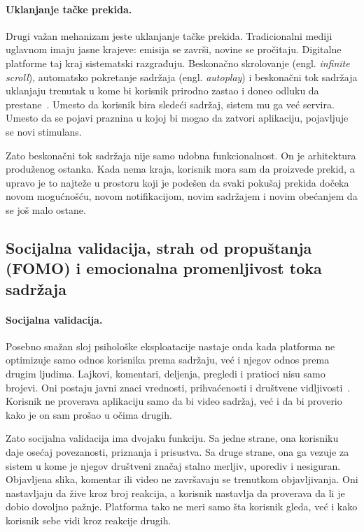 \paragraph{Uklanjanje tačke prekida.}
Drugi važan mehanizam jeste uklanjanje tačke prekida. Tradicionalni mediji uglavnom imaju jasne krajeve: emisija se završi, novine se pročitaju. Digitalne platforme taj kraj sistematski razgrađuju. Beskonačno skrolovanje (engl. \textit{infinite scroll}), automatsko pokretanje sadržaja (engl. \textit{autoplay}) i beskonačni tok sadržaja uklanjaju trenutak u kome bi korisnik prirodno zastao i doneo odluku da prestane~\cite{montag2019addictive}. Umesto da korisnik bira sledeći sadržaj, sistem mu ga već servira. Umesto da se pojavi praznina u kojoj bi mogao da zatvori aplikaciju, pojavljuje se novi stimulans.

Zato beskonačni tok sadržaja nije samo udobna funkcionalnost. On je arhitektura produženog ostanka. Kada nema kraja, korisnik mora sam da proizvede prekid, a upravo je to najteže u prostoru koji je podešen da svaki pokušaj prekida dočeka novom mogućnošću, novom notifikacijom, novim sadržajem i novim obećanjem da se još malo ostane.

\subsection{Socijalna validacija, strah od propuštanja (FOMO) i emocionalna promenljivost toka sadržaja}

\paragraph{Socijalna validacija.}
Posebno snažan sloj psihološke eksploatacije nastaje onda kada platforma ne optimizuje samo odnos korisnika prema sadržaju, već i njegov odnos prema drugim ljudima. Lajkovi, komentari, deljenja, pregledi i pratioci nisu samo brojevi. Oni postaju javni znaci vrednosti, prihvaćenosti i društvene vidljivosti~\cite{wadsley2022reward}. Korisnik ne proverava aplikaciju samo da bi video sadržaj, već i da bi proverio kako je on sam prošao u očima drugih.

Zato socijalna validacija ima dvojaku funkciju. Sa jedne strane, ona korisniku daje osećaj povezanosti, priznanja i prisustva. Sa druge strane, ona ga vezuje za sistem u kome je njegov društveni značaj stalno merljiv, uporediv i nesiguran. Objavljena slika, komentar ili video ne završavaju se trenutkom objavljivanja. Oni nastavljaju da žive kroz broj reakcija, a korisnik nastavlja da proverava da li je dobio dovoljno pažnje. Platforma tako ne meri samo šta korisnik gleda, već i kako korisnik sebe vidi kroz reakcije drugih.

